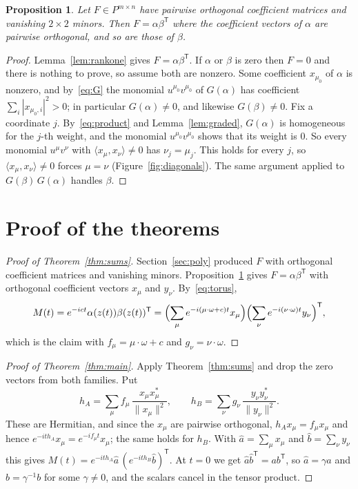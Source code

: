 \documentclass[11pt]{article}
\newtheorem{proposition}[theorem]{Proposition}
\theoremstyle{remark}
\newcommand{\ip}[2]{\langle #1,#2\rangle}
\begin{document}
\begin{proposition}\label{prop:core}
Let $F\in P^{m\times n}$ have pairwise orthogonal coefficient matrices and vanishing $2\times2$
minors. Then $F=\alpha\beta^{\mathsf T}$ where the coefficient vectors of $\alpha$ are
pairwise orthogonal, and so are those of $\beta$.
\end{proposition}

\begin{proof}
Lemma~\ref{lem:rankone} gives $F=\alpha\beta^{\mathsf T}$. If $\alpha$ or $\beta$ is zero then
$F=0$ and there is nothing to prove, so assume both are nonzero. Some coefficient
$x_{\mu_0}$ of $\alpha$ is nonzero, and by~\eqref{eq:G} the monomial $u^{\mu_0}v^{\mu_0}$ of
$G(\alpha)$ has coefficient $\sum_i|x_{\mu_0,i}|^2>0$; in particular $G(\alpha)\ne0$, and
likewise $G(\beta)\ne0$. Fix a coordinate $j$. By~\eqref{eq:product} and
Lemma~\ref{lem:graded}, $G(\alpha)$ is homogeneous for the $j$-th weight, and the monomial
$u^{\mu_0}v^{\mu_0}$ shows that its weight is $0$. So every monomial $u^\mu v^\nu$ with
$\ip{x_\mu}{x_\nu}\ne0$ has $\nu_j=\mu_j$. This holds for every $j$, so $\ip{x_\mu}{x_\nu}\ne
0$ forces $\mu=\nu$ (Figure~\ref{fig:diagonals}). The same argument applied to $G(\beta)\,
G(\alpha)$ handles $\beta$.
\end{proof}

\section{Proof of the theorems}

\begin{proof}[Proof of Theorem~\ref{thm:sums}]
Section~\ref{sec:poly} produced $F$ with orthogonal coefficient matrices and vanishing minors.
Proposition~\ref{prop:core} gives $F=\alpha\beta^{\mathsf T}$ with orthogonal coefficient
vectors $x_\mu$ and $y_\nu$. By~\eqref{eq:torus},
\[
M(t)=e^{-ict}\alpha(z(t))\beta(z(t))^{\mathsf T}=\Bigl(\sum_\mu e^{-i(\mu\cdot\omega+c)t}
x_\mu\Bigr)\Bigl(\sum_\nu e^{-i(\nu\cdot\omega)t}y_\nu\Bigr)^{\mathsf T},
\]
which is the claim with $f_\mu=\mu\cdot\omega+c$ and $g_\nu=\nu\cdot\omega$.
\end{proof}

\begin{proof}[Proof of Theorem~\ref{thm:main}]
Apply Theorem~\ref{thm:sums} and drop the zero vectors from both families. Put
\[
h_A=\sum_\mu f_\mu\,\frac{x_\mu x_\mu^{*}}{\lVert x_\mu\rVert^2},\qquad
h_B=\sum_\nu g_\nu\,\frac{y_\nu y_\nu^{*}}{\lVert y_\nu\rVert^2}.
\]
These are Hermitian, and since the $x_\mu$ are pairwise orthogonal, $h_Ax_\mu=f_\mu x_\mu$ and
hence $e^{-ith_A}x_\mu=e^{-if_\mu t}x_\mu$; the same holds for $h_B$. With $\hat a=\sum_\mu
x_\mu$ and $\hat b=\sum_\nu y_\nu$ this gives $M(t)=e^{-ith_A}\hat a\,(e^{-ith_B}\hat b)^{
\mathsf T}$. At $t=0$ we get $\hat a\hat b^{\mathsf T}=ab^{\mathsf T}$, so $\hat a=\gamma a$
and $\hat b=\gamma^{-1}b$ for some $\gamma\ne0$, and the scalars cancel in the tensor
product.
\end{proof}
\end{document}
